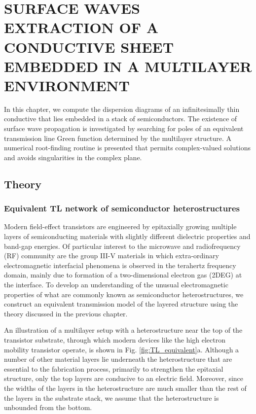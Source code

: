 \chapter{\uppercase{Surface waves extraction of a conductive sheet embedded in a multilayer environment}}

In this chapter, we compute the dispersion diagrams of an infinitesimally thin conductive that lies embedded in a stack of semiconductors. The existence of surface wave propagation is investigated by searching for poles of an equivalent transmission line Green function determined by the multilayer structure. A numerical root-finding routine is presented that permits complex-valued solutions and avoids singularities in the complex plane.

\section{Theory}
\subsection{Equivalent TL network of semiconductor heterostructures}
%
Modern field-effect transistors are engineered by epitaxially growing multiple layers of semiconducting materials with slightly different dielectric properties and band-gap energies. Of particular interest to the microwave and radiofrequency (RF) community are the group III-V materials in which extra-ordinary electromagnetic interfacial phenomena is observed in the terahertz frequency domain, mainly due to formation of a two-dimensional electron gas (2DEG) at the interface. To develop an understanding of the unusual electromagnetic properties of what are commonly known as semiconductor heterostructures, we construct an equivalent transmission model of the layered structure using the theory discussed in the previous chapter.

An illustration of a multilayer setup with a heterostructure near the top of the transistor substrate, through which modern devices like the high electron mobility transistor operate, is shown in Fig. \ref{fig:TL_equivalent}a. Although a number of other material layers lie underneath the heterostructure that are essential to the fabrication process, primarily to strengthen the epitaxial structure, only the top layers are conducive to an electric field. Moreover, since the widths of the layers in the heterostructure are much smaller than the rest of the layers in the substrate stack, we assume that the heterostructure is unbounded from the bottom.

